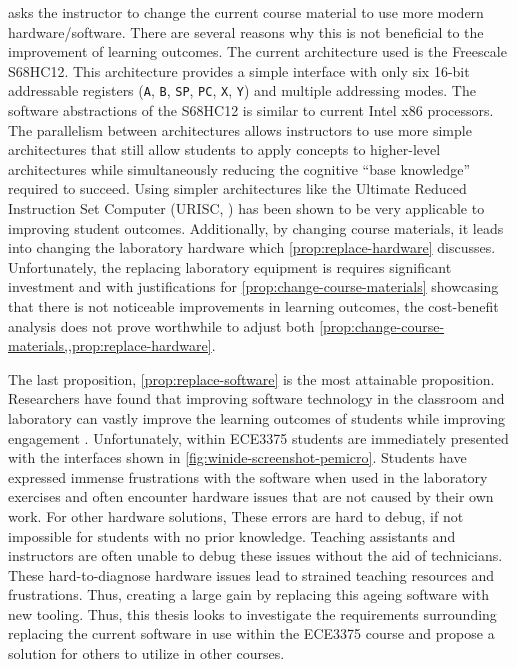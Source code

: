  asks the instructor to change the current course material to use more modern hardware/software. There are several reasons why this is not beneficial to the improvement of learning outcomes. The current architecture used is the Freescale S68HC12. This architecture provides a simple interface with only six 16-bit addressable registers (\verb|A|, \verb|B|, \verb|SP|, \verb|PC|, \verb|X|, \verb|Y|) and multiple addressing modes\cite{hc12Manual2006}. The software abstractions of the S68HC12 is similar to current Intel\textregistered{} x86 processors\cite{intel2017}. The parallelism between architectures allows instructors to use more simple architectures that still allow students to apply concepts to higher-level architectures while simultaneously reducing the cognitive ``base knowledge'' required to succeed. Using simpler architectures like the Ultimate Reduced Instruction Set Computer (URISC, \cite{mavaddat1988}) has been shown to be very applicable to improving student outcomes\cite{Nakamura2013, McLoughlin2010, mavaddat1988}. Additionally, by changing course materials, it leads into changing the laboratory hardware which \cref{prop:replace-hardware} discusses. Unfortunately, the replacing laboratory equipment is requires significant investment and with justifications for \cref{prop:change-course-materials} showcasing that there is not noticeable improvements in learning outcomes, the cost-benefit analysis does not prove worthwhile to adjust both \cref{prop:change-course-materials,,prop:replace-hardware}.

The last proposition, \cref{prop:replace-software} is the most attainable proposition. Researchers have found that improving software technology in the classroom and laboratory can vastly improve the learning outcomes of students while improving engagement \cite{Ackovska2014, Stolikj2011, Ristov2011, Ristov2014, Nikolic2009, Skillen2011, Tappan2009, Djordjevic2005, cec2016}. Unfortunately, within ECE3375 students are immediately presented with the interfaces shown in \cref{fig:winide-screenshot-pemicro}. Students have expressed immense frustrations with the software when used in the laboratory exercises and often encounter hardware issues that are not caused by their own work\cite{evals:ece3375-2013, evals:ece3375-2014}. For other hardware solutions,  These errors are hard to debug, if not impossible for students with no prior knowledge. Teaching assistants and instructors are often unable to debug these issues without the aid of technicians. These hard-to-diagnose hardware issues lead to strained teaching resources and frustrations. Thus, creating a large gain by replacing this ageing software with new tooling. Thus, this thesis looks to investigate the requirements surrounding replacing the current software in use within the ECE3375 course and propose a solution for others to utilize in other courses. 

